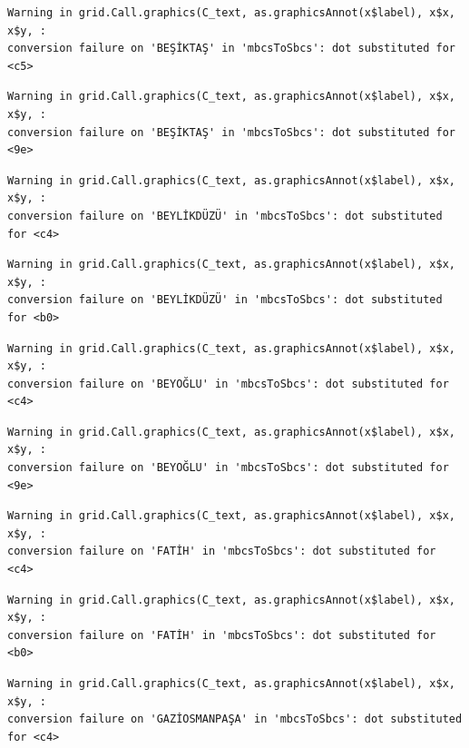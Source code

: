 \documentclass[
  11pt,
  a4paper,
  DIV=11,
  numbers=noendperiod]{scrartcl}
\begin{document}
\begin{verbatim}
Warning in grid.Call.graphics(C_text, as.graphicsAnnot(x$label), x$x, x$y, :
conversion failure on 'BEŞİKTAŞ' in 'mbcsToSbcs': dot substituted for <c5>
\end{verbatim}

\begin{verbatim}
Warning in grid.Call.graphics(C_text, as.graphicsAnnot(x$label), x$x, x$y, :
conversion failure on 'BEŞİKTAŞ' in 'mbcsToSbcs': dot substituted for <9e>
\end{verbatim}

\begin{verbatim}
Warning in grid.Call.graphics(C_text, as.graphicsAnnot(x$label), x$x, x$y, :
conversion failure on 'BEYLİKDÜZÜ' in 'mbcsToSbcs': dot substituted for <c4>
\end{verbatim}

\begin{verbatim}
Warning in grid.Call.graphics(C_text, as.graphicsAnnot(x$label), x$x, x$y, :
conversion failure on 'BEYLİKDÜZÜ' in 'mbcsToSbcs': dot substituted for <b0>
\end{verbatim}

\begin{verbatim}
Warning in grid.Call.graphics(C_text, as.graphicsAnnot(x$label), x$x, x$y, :
conversion failure on 'BEYOĞLU' in 'mbcsToSbcs': dot substituted for <c4>
\end{verbatim}

\begin{verbatim}
Warning in grid.Call.graphics(C_text, as.graphicsAnnot(x$label), x$x, x$y, :
conversion failure on 'BEYOĞLU' in 'mbcsToSbcs': dot substituted for <9e>
\end{verbatim}

\begin{verbatim}
Warning in grid.Call.graphics(C_text, as.graphicsAnnot(x$label), x$x, x$y, :
conversion failure on 'FATİH' in 'mbcsToSbcs': dot substituted for <c4>
\end{verbatim}

\begin{verbatim}
Warning in grid.Call.graphics(C_text, as.graphicsAnnot(x$label), x$x, x$y, :
conversion failure on 'FATİH' in 'mbcsToSbcs': dot substituted for <b0>
\end{verbatim}

\begin{verbatim}
Warning in grid.Call.graphics(C_text, as.graphicsAnnot(x$label), x$x, x$y, :
conversion failure on 'GAZİOSMANPAŞA' in 'mbcsToSbcs': dot substituted for <c4>
\end{verbatim}
\end{document}
